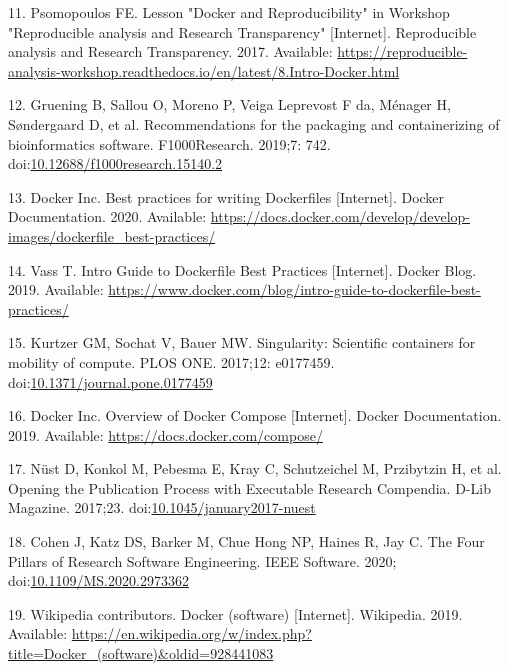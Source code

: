 \documentclass[10pt,letterpaper]{article}
\begin{document}
\leavevmode\hypertarget{ref-psomopoulos_lesson_2017}{}%
11. Psomopoulos FE. Lesson "Docker and Reproducibility" in Workshop
"Reproducible analysis and Research Transparency" {[}Internet{]}.
Reproducible analysis and Research Transparency. 2017. Available:
\url{https://reproducible-analysis-workshop.readthedocs.io/en/latest/8.Intro-Docker.html}

\leavevmode\hypertarget{ref-gruening_recommendations_2019}{}%
12. Gruening B, Sallou O, Moreno P, Veiga Leprevost F da, Ménager H,
Søndergaard D, et al. Recommendations for the packaging and
containerizing of bioinformatics software. F1000Research. 2019;7: 742.
doi:\href{https://doi.org/10.12688/f1000research.15140.2}{10.12688/f1000research.15140.2}

\leavevmode\hypertarget{ref-docker_inc_best_2020}{}%
13. Docker Inc. Best practices for writing Dockerfiles {[}Internet{]}.
Docker Documentation. 2020. Available:
\url{https://docs.docker.com/develop/develop-images/dockerfile_best-practices/}

\leavevmode\hypertarget{ref-vass_intro_2019}{}%
14. Vass T. Intro Guide to Dockerfile Best Practices {[}Internet{]}.
Docker Blog. 2019. Available:
\url{https://www.docker.com/blog/intro-guide-to-dockerfile-best-practices/}

\leavevmode\hypertarget{ref-kurtzer_singularity_2017}{}%
15. Kurtzer GM, Sochat V, Bauer MW. Singularity: Scientific containers
for mobility of compute. PLOS ONE. 2017;12: e0177459.
doi:\href{https://doi.org/10.1371/journal.pone.0177459}{10.1371/journal.pone.0177459}

\leavevmode\hypertarget{ref-docker-compose_2019}{}%
16. Docker Inc. Overview of Docker Compose {[}Internet{]}. Docker
Documentation. 2019. Available: \url{https://docs.docker.com/compose/}

\leavevmode\hypertarget{ref-nust_opening_2017}{}%
17. Nüst D, Konkol M, Pebesma E, Kray C, Schutzeichel M, Przibytzin H,
et al. Opening the Publication Process with Executable Research
Compendia. D-Lib Magazine. 2017;23.
doi:\href{https://doi.org/10.1045/january2017-nuest}{10.1045/january2017-nuest}

\leavevmode\hypertarget{ref-cohen_four_2020}{}%
18. Cohen J, Katz DS, Barker M, Chue Hong NP, Haines R, Jay C. The Four
Pillars of Research Software Engineering. IEEE Software. 2020;
doi:\href{https://doi.org/10.1109/MS.2020.2973362}{10.1109/MS.2020.2973362}

\leavevmode\hypertarget{ref-wikipedia_contributors_docker_2019}{}%
19. Wikipedia contributors. Docker (software) {[}Internet{]}. Wikipedia.
2019. Available:
\url{https://en.wikipedia.org/w/index.php?title=Docker_(software)\&oldid=928441083}
\end{document}
